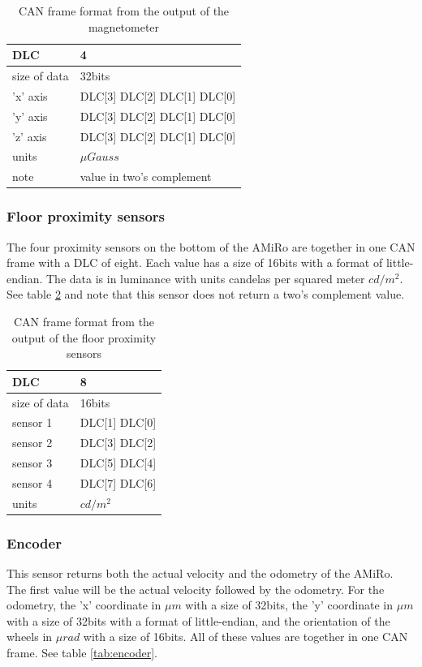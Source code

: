 \documentclass[12pt]{report}%
\begin{document}
\begin{table}[h!]
\centering
\begin{tabular}{|l|l|}
	\hline
	DLC						&	4														\\	\hline
	size of data	&	32bits											\\	\hline
	'x' axis			&	DLC[3] DLC[2] DLC[1] DLC[0]	\\	\hline
	'y'	axis			&	DLC[3] DLC[2] DLC[1] DLC[0]	\\	\hline
	'z'	axis			&	DLC[3] DLC[2] DLC[1] DLC[0]	\\	\hline
	units					&	$\mu Gauss$									\\	\hline
	note					& value in two's complement 	\\	\hline
\end{tabular}
\caption{\label{tab:magnetometer} CAN frame format from the output of the magnetometer}
\end{table}

\subsubsection{Floor proximity sensors}
The four proximity sensors on the bottom of the AMiRo are together in one CAN frame with a DLC of eight. Each value has a size of 16bits with a format of little-endian. The data is in luminance with units candelas per squared meter $cd/m^2$. See table \ref{tab:floorprox} and note that this sensor does not return a two's complement value.

\begin{table}[h!]
\centering
\begin{tabular}{|l|l|}
	\hline
	DLC						&	8													\\	\hline
	size of data	&	16bits										\\	\hline
	sensor 1			&	DLC[1] DLC[0]							\\	\hline
  sensor 2			&	DLC[3] DLC[2]							\\	\hline
	sensor 3			&	DLC[5] DLC[4]							\\	\hline
	sensor 4			&	DLC[7] DLC[6]							\\	\hline
	units					&	$cd/m^2$									\\	\hline
\end{tabular}
\caption{\label{tab:floorprox} CAN frame format from the output of the floor proximity sensors}
\end{table}

\subsubsection{Encoder}
This sensor returns both the actual velocity and the odometry of the AMiRo. The first value will be the actual velocity followed by the odometry. For the odometry, the 'x' coordinate in $\mu m$ with a size of 32bits, the 'y' coordinate in $\mu m$ with a size of 32bits with a format of little-endian, and the orientation of the wheels in $\mu rad$ with a size of 16bits. All of these values are together in one CAN frame. See table \ref{tab:encoder}.
\end{document}
